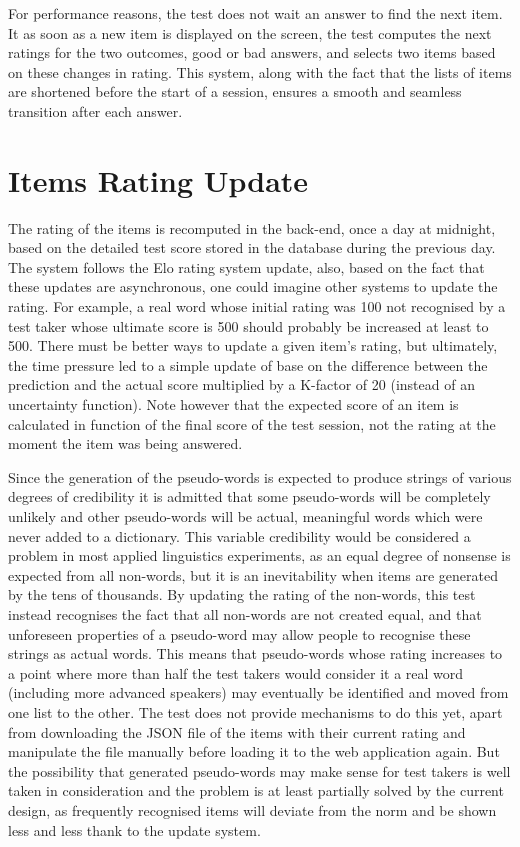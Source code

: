 For performance reasons, the test does not wait an answer to find the next item. It as soon as a new item is displayed on the screen, the test computes the next ratings for the two outcomes, good or bad answers, and selects two items based on these changes in rating. This system, along with the fact that the lists of items are shortened before the start of a session, ensures a smooth and seamless transition after each answer.

\section{Items Rating Update}
The rating of the items is recomputed in the back-end, once a day at midnight, based on the detailed test score stored in the database during the previous day. The system follows the Elo rating system update, also, based on the fact that these updates are asynchronous, one could imagine other systems to update the rating. For example, a real word whose initial rating was 100 not recognised by a test taker whose ultimate score is 500 should probably be increased at least to 500. There must be better ways to update a given item's rating, but ultimately, the time pressure led to a simple update of base on the difference between the prediction and the actual score multiplied by a K-factor of 20 (instead of an uncertainty function). Note however that the expected score of an item is calculated in function of the final score of the test session, not the rating at the moment the item was being answered.

Since the generation of the pseudo-words is expected to produce strings of various degrees of credibility it is admitted that some pseudo-words will be completely unlikely and other pseudo-words will be actual, meaningful words which were never added to a dictionary. This variable credibility would be considered a problem in most applied linguistics experiments, as an equal degree of nonsense is expected from all non-words, but it is an inevitability when items are generated by the tens of thousands. By updating the rating of the non-words, this test instead recognises the fact that all non-words are not created equal, and that unforeseen properties of a pseudo-word may allow people to recognise these strings as actual words. This means that pseudo-words whose rating increases to a point where more than half the test takers would consider it a real word (including more advanced speakers) may eventually be identified and moved from one list to the other. The test does not provide mechanisms to do this yet, apart from downloading the JSON file of the items with their current rating and manipulate the file manually before loading it to the web application again. But the possibility that generated pseudo-words may make sense for test takers is well taken in consideration and the problem is at least partially solved by the current design, as frequently recognised items will deviate from the norm and be shown less and less thank to the update system.

